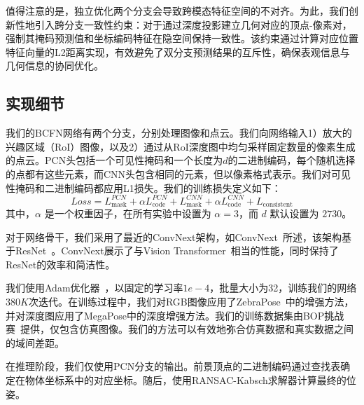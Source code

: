 \par 值得注意的是，独立优化两个分支会导致跨模态特征空间的不对齐。为此，我们创新性地引入跨分支一致性约束：对于通过深度投影建立几何对应的顶点-像素对，强制其掩码预测值和坐标编码特征在隐空间保持一致性。该约束通过计算对应位置特征向量的L2距离实现，有效避免了双分支预测结果的互斥性，确保表观信息与几何信息的协同优化。

\subsection{实现细节}

我们的BCFN网络有两个分支，分别处理图像和点云。我们向网络输入1）放大的兴趣区域（RoI）图像，以及2）通过从RoI深度图中均匀采样固定数量的像素生成的点云。PCN头包括一个可见性掩码和一个长度为$d$的二进制编码，每个随机选择的点都有这些元素，而CNN头包含相同的元素，但以像素格式表示。我们对可见性掩码和二进制编码都应用L1损失。我们的训练损失定义如下：
\begin{equation}
Loss = L_\text{mask}^{PCN} + \alpha L_\text{code}^{PCN} + L_\text{mask}^{CNN} + \alpha L_\text{code}^{CNN} + L_{\text{consistent}}
\end{equation}
其中，$\alpha$ 是一个权重因子，在所有实验中设置为 $\alpha = 3$，而 $d$ 默认设置为 $2730$。

对于网络骨干，我们采用了最近的ConvNext架构，如ConvNext~\cite{Liu2022ACF}所述，该架构基于ResNet~\cite{He2015DeepRL}。ConvNext展示了与Vision Transformer~\cite{Dosovitskiy2020AnII}相当的性能，同时保持了ResNet的效率和简洁性。

我们使用Adam优化器~\cite{Kingma2014AdamAM}，以固定的学习率$1e-4$，批量大小为32，训练我们的网络$380K$次迭代。在训练过程中，我们对RGB图像应用了ZebraPose~\cite{su2022zebrapose}中的增强方法，并对深度图应用了MegaPose\cite{Labbe2022MegaPose6P}中的深度增强方法。我们的训练数据集由BOP挑战赛~\cite{hodan2024bop}提供，仅包含仿真图像。我们的方法可以有效地弥合仿真数据和真实数据之间的域间差距。

在推理阶段，我们仅使用PCN分支的输出。前景顶点的二进制编码通过查找表确定在物体坐标系中的对应坐标。随后，使用RANSAC-Kabsch求解器计算最终的位姿。